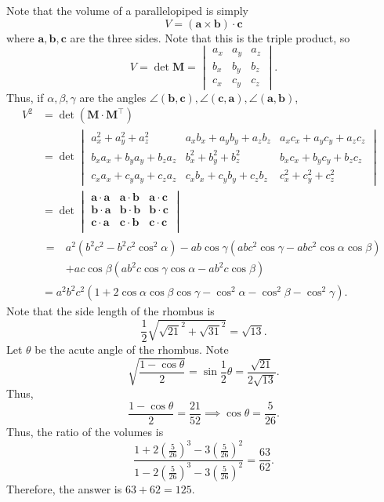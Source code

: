 \documentclass[11pt]{article}
\theoremstyle{definition}
\begin{document}
\begin{solution}[name={Solution by naman12}]
	Note that the volume of a parallelopiped is simply
	\[V=(\mathbf a\times\mathbf b)\cdot\mathbf c\]where $\mathbf a,\mathbf b,\mathbf c$ are the three sides. Note that this is the triple product, so
	\[V=\det\mathbf M=\begin{vmatrix}a_x&a_y&a_z\\b_x&b_y&b_z\\c_x&c_y&c_z\end{vmatrix}.\]
	Thus, if $\alpha,\beta,\gamma$ are the angles $\angle(\mathbf b,\mathbf c),\angle(\mathbf c,\mathbf a),\angle(\mathbf a,\mathbf b)$,
	\[\begin{aligned}
		V^2&=\det(\mathbf M\cdot\mathbf M^\intercal)\\
		&=\det\begin{vmatrix}
			a_x^2+a_y^2+a_z^2&a_xb_x+a_yb_y+a_zb_z&a_xc_x+a_yc_y+a_zc_z\\
			b_xa_x+b_ya_y+b_za_z&b_x^2+b_y^2+b_z^2&b_xc_x+b_yc_y+b_zc_z\\
			c_xa_x+c_ya_y+c_za_z&c_xb_x+c_yb_y+c_zb_z&c_x^2+c_y^2+c_z^2
		\end{vmatrix}\\
		&=\det\begin{vmatrix}
			\mathbf a\cdot\mathbf a&\mathbf a\cdot\mathbf b&\mathbf a\cdot\mathbf c\\
			\mathbf b\cdot\mathbf a&\mathbf b\cdot\mathbf b&\mathbf b\cdot\mathbf c\\
			\mathbf c\cdot\mathbf a&\mathbf c\cdot\mathbf b&\mathbf c\cdot\mathbf c\\
		\end{vmatrix}\\
		&
		\begin{aligned}
			{}=~&a^2(b^2c^2-b^2c^2\cos^2\alpha)-ab\cos\gamma(abc^2\cos\gamma-abc^2\cos\alpha\cos\beta)\\
			&+ac\cos\beta(ab^2c\cos\gamma\cos\alpha-ab^2c\cos\beta)
		\end{aligned}\\
		&=a^2b^2c^2(1+2\cos\alpha\cos\beta\cos\gamma-\cos^2\alpha-\cos^2\beta-\cos^2\gamma).
	\end{aligned}\]Note that the side length of the rhombus is
	\[\frac 12\sqrt{\sqrt{21}^2+\sqrt{31}^2}=\sqrt{13}.\]Let $\theta$ be the acute angle of the rhombus. Note
	\[\sqrt{\frac{1-\cos\theta}2}=\sin\frac12\theta=\frac{\sqrt{21}}{2\sqrt{13}}.\]Thus,
	\[\frac{1-\cos\theta}2=\frac{21}{52}\implies\cos\theta=\frac{5}{26}.\]Thus, the ratio of the volumes is
	\[\frac{1+2(\frac 5{26})^3-3(\frac 5{26})^2}{1-2(\frac 5{26})^3-3(\frac 5{26})^2}=\frac{63}{62}.\]Therefore, the answer is $63+62=\boxed{125}$.
\end{solution}
\end{document}
